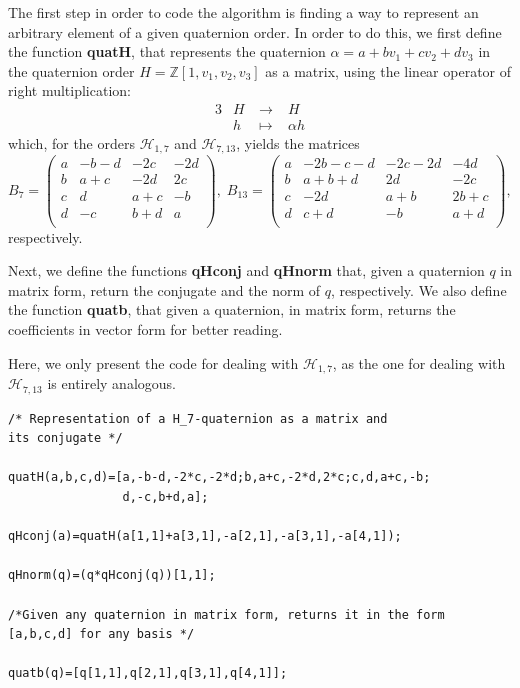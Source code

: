 \documentclass[10pt]{article}
\theoremstyle{definition}
\newcommand\ZZ{\mathbb{Z}}
\newcommand\hh{\mathcal{H}}
\begin{document}
The first step in order to code the algorithm is finding a way to
represent an arbitrary element of a given quaternion order. In order
to do this, we first define the function \textbf{quatH}, that
represents the quaternion $\alpha = a + b v_1 + c v_2 + d v_3$ in the
quaternion order $H=\ZZ[1,v_1,v_2, v_3]$ as a matrix, using the linear
operator of right multiplication:
%
\begin{alignat*}{3}
  & H \ & \longrightarrow & \; H \\
  & h \ & \longmapsto & \; \alpha h
\end{alignat*}
%
which, for the orders $\hh_{1,7}$ and $\hh_{7,13}$, yields the
matrices
%
\small
%
\[ B_7=
  \begin{pmatrix}
    a & -b-d & -2c & -2d \\
    b & a+c & -2d & 2c \\
    c & d & a+c & -b \\
    d & -c & b+d & a \\
  \end{pmatrix}, \; B_{13}=\begin{pmatrix}
    a & -2b-c-d & -2c-2d & -4d \\
    b & a+b+d & 2d & -2c \\
    c & -2d & a+b & 2b+c \\
    d & c+d & -b & a+d \\
  \end{pmatrix}, \]
%
\normalsize respectively.

Next, we define the functions \textbf{qHconj} and \textbf{qHnorm}
that, given a quaternion $q$ in matrix form, return the conjugate and
the norm of $q$, respectively. We also define the function
\textbf{quatb}, that given a quaternion, in matrix form, returns the
coefficients in vector form for better reading.

Here, we only present the code for dealing with $\hh_{1,7}$, as the
one for dealing with $\hh_{7,13}$ is entirely analogous.

\footnotesize

\begin{lstlisting}
/* Representation of a H_7-quaternion as a matrix and
its conjugate */

quatH(a,b,c,d)=[a,-b-d,-2*c,-2*d;b,a+c,-2*d,2*c;c,d,a+c,-b;
                d,-c,b+d,a];

qHconj(a)=quatH(a[1,1]+a[3,1],-a[2,1],-a[3,1],-a[4,1]);

qHnorm(q)=(q*qHconj(q))[1,1];

/*Given any quaternion in matrix form, returns it in the form 
[a,b,c,d] for any basis */

quatb(q)=[q[1,1],q[2,1],q[3,1],q[4,1]]; 
\end{lstlisting}
\end{document}
